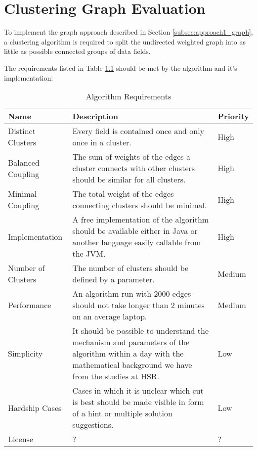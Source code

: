 \chapter{Clustering Graph Evaluation}
\label{appendix:graphClustering}

To implement the graph approach described in Section \ref{subsec:approach1_graph}, a clustering algorithm is required to split the undirected weighted graph into as little as possible connected groups of data fields. 

The requirements listed in Table \ref{tab:requirementsAlgorithm} should be met by the algorithm and it's implementation:

\begin{table}[H]
	\centering
	\caption{Algorithm Requirements}
	\label{tab:requirementsAlgorithm}
	\begin{tabular}{|p{100pt}|p{250pt}|p{50pt}|}
		\hline	
		Name & Description & Priority \\
		\hline
		Distinct Clusters & Every field is contained once and only once in a cluster. & High  \\
		\hline
		Balanced Coupling & The sum of weights of the edges a cluster connects with other clusters should be similar for all clusters. & High \\
		\hline
		Minimal Coupling & The total weight of the edges connecting clusters should be minimal. & High \\
		\hline
		Implementation & A free implementation of the algorithm should be available either in Java or another language easily callable from the \gls{JVM}. & High  \\
		\hline
		Number of Clusters & The number of clusters should be defined by a parameter. & Medium \\
		\hline
		Performance & An algorithm run with 2000 edges should not take longer than 2 minutes on an average laptop. & Medium \\
		\hline
		Simplicity & It should be possible to understand the mechanism and parameters of the algorithm within a day with the mathematical background we have from the studies at \gls{HSR}. & Low \\
		\hline
		Hardship Cases & Cases in which it is unclear which cut is best should be made visible in form of a hint or multiple solution suggestions. & Low \\
		\hline
		License & ? & ? \\
		\hline
	\end{tabular}
\end{table}

